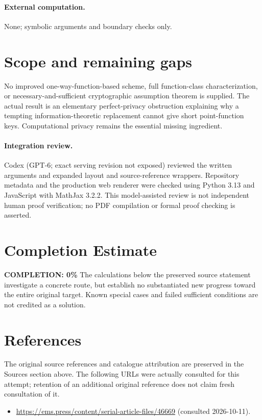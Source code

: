 \documentclass[11pt]{article}
\begin{document}
\paragraph{External computation.} None; symbolic arguments and boundary checks only.
\section{Scope and remaining gaps}
No improved one-way-function-based scheme, full function-class characterization, or necessary-and-sufficient cryptographic assumption theorem is supplied. The actual result is an elementary perfect-privacy obstruction explaining why a tempting information-theoretic replacement cannot give short point-function keys. Computational privacy remains the essential missing ingredient.
\paragraph{Integration review.} Codex (GPT-6; exact serving revision not exposed) reviewed the written arguments and expanded layout and source-reference wrappers. Repository metadata and the production web renderer were checked using Python 3.13 and JavaScript with MathJax 3.2.2. This model-assisted review is not independent human proof verification; no PDF compilation or formal proof checking is asserted.

\section{Completion Estimate}
\noindent\textbf{COMPLETION: 0\%}
The calculations below the preserved source statement investigate a concrete route,
but establish no substantiated new progress toward the entire original target.
Known special cases and failed sufficient conditions are not credited as a solution.
\section{References}
The original source references and catalogue attribution are preserved in the
Sources section above. The following URLs were actually consulted for this attempt;
retention of an additional original reference does not claim fresh consultation of it.
\begin{itemize}
\item \url{https://ems.press/content/serial-article-files/46669} (consulted 2026-10-11). 
\end{itemize}
\end{document}
